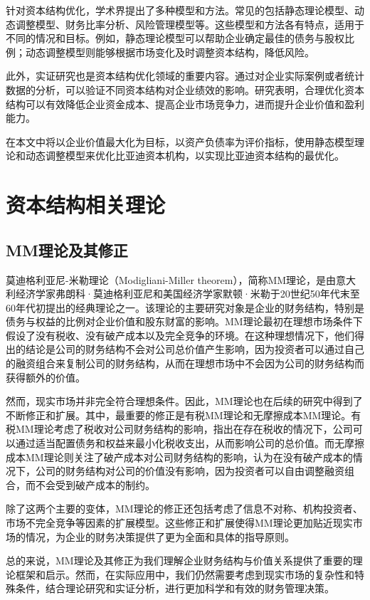 针对资本结构优化，学术界提出了多种模型和方法。常见的包括静态理论模型、动态调整模型、财务比率分析、风险管理模型等。这些模型和方法各有特点，适用于不同的情况和目标。例如，静态理论模型可以帮助企业确定最佳的债务与股权比例；动态调整模型则能够根据市场变化及时调整资本结构，降低风险。

此外，实证研究也是资本结构优化领域的重要内容。通过对企业实际案例或者统计数据的分析，可以验证不同资本结构对企业绩效的影响。研究表明，合理优化资本结构可以有效降低企业资金成本、提高企业市场竞争力，进而提升企业价值和盈利能力。

在本文中将以企业价值最大化为目标，以资产负债率为评价指标，使用静态模型理论和动态调整模型来优化比亚迪资本机构，以实现比亚迪资本结构的最优化。
\section{资本结构相关理论}
\subsection{MM理论及其修正}
莫迪格利亚尼-米勒理论（Modigliani-Miller theorem），简称MM理论，是由意大利经济学家弗朗科·莫迪格利亚尼和美国经济学家默顿·米勒于20世纪50年代末至60年代初提出的经典理论之一。\cite{Modigliani1958}该理论的主要研究对象是企业的财务结构，特别是债务与权益的比例对企业价值和股东财富的影响。MM理论最初在理想市场条件下假设了没有税收、没有破产成本以及完全竞争的环境。在这种理想情况下，他们得出的结论是公司的财务结构不会对公司总价值产生影响，因为投资者可以通过自己的融资组合来复制公司的财务结构，从而在理想市场中不会因为公司的财务结构而获得额外的价值。

然而，现实市场并非完全符合理想条件。因此，MM理论也在后续的研究中得到了不断修正和扩展。其中，最重要的修正是有税MM理论和无摩擦成本MM理论。有税MM理论考虑了税收对公司财务结构的影响，指出在存在税收的情况下，公司可以通过适当配置债务和权益来最小化税收支出，从而影响公司的总价值。而无摩擦成本MM理论则关注了破产成本对公司财务结构的影响，认为在没有破产成本的情况下，公司的财务结构对公司的价值没有影响，因为投资者可以自由调整融资组合，而不会受到破产成本的制约。\cite{Dong2019}

除了这两个主要的变体，MM理论的修正还包括考虑了信息不对称、机构投资者、市场不完全竞争等因素的扩展模型。这些修正和扩展使得MM理论更加贴近现实市场的情况，为企业的财务决策提供了更为全面和具体的指导原则。\cite{Yang2014}

总的来说，MM理论及其修正为我们理解企业财务结构与价值关系提供了重要的理论框架和启示。然而，在实际应用中，我们仍然需要考虑到现实市场的复杂性和特殊条件，结合理论研究和实证分析，进行更加科学和有效的财务管理决策。
